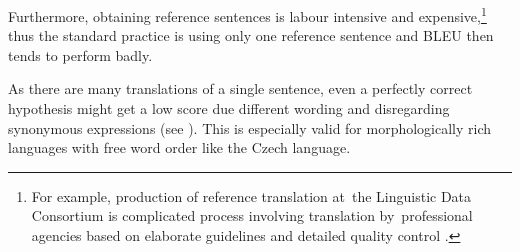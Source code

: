 
Furthermore, obtaining reference sentences is labour intensive and 
expensive,\footnote{For example, production of reference translation  at~the 
Linguistic Data Consortium is complicated process involving translation 
by~professional agencies based on elaborate guidelines and detailed quality 
control \cite{strassel}.} thus the standard practice is using only one 
reference sentence and BLEU then tends to perform badly. 

As there are many translations of a single sentence, even a perfectly correct 
hypothesis might get a low score due different wording and disregarding 
synonymous expressions (see ). This is 
especially valid for morphologically rich languages with free word order 
like the Czech language. \cite{bojar-tackling-sparse-data}


